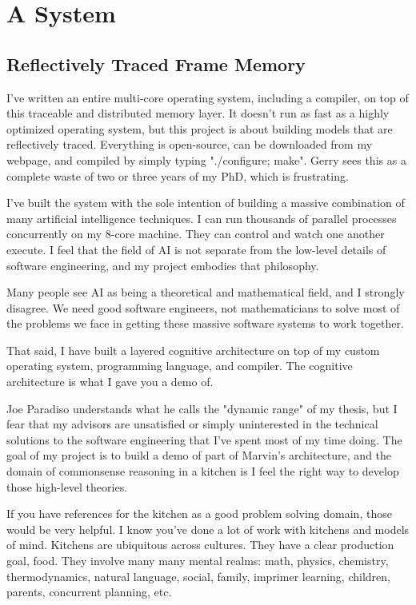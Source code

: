 \chapter{A System}\label{ch:a_system}

\section{Reflectively Traced Frame Memory}


I've written an entire multi-core operating system, including a
compiler, on top of this traceable and distributed memory layer.  It
doesn't run as fast as a highly optimized operating system, but this
project is about building models that are reflectively traced.
Everything is open-source, can be downloaded from my webpage, and
compiled by simply typing "./configure; make".  Gerry sees this as a
complete waste of two or three years of my PhD, which is frustrating.

I've built the system with the sole intention of building a massive
combination of many artificial intelligence techniques.  I can run
thousands of parallel processes concurrently on my 8-core machine.  They
can control and watch one another execute.  I feel that the field of AI
is not separate from the low-level details of software engineering, and
my project embodies that philosophy.

Many people see AI as being a theoretical and mathematical field, and I
strongly disagree.  We need good software engineers, not mathematicians
to solve most of the problems we face in getting these massive software
systems to work together.

That said, I have built a layered cognitive architecture on top of my
custom operating system, programming language, and compiler.  The
cognitive architecture is what I gave you a demo of.

Joe Paradiso understands what he calls the "dynamic range" of my thesis,
but I fear that my advisors are unsatisfied or simply uninterested in
the technical solutions to the software engineering that I've spent most
of my time doing.  The goal of my project is to build a demo of part of
Marvin's architecture, and the domain of commonsense reasoning in a
kitchen is I feel the right way to develop those high-level theories.

If you have references for the kitchen as a good problem solving domain,
those would be very helpful.  I know you've done a lot of work with
kitchens and models of mind.  Kitchens are ubiquitous across cultures.
They have a clear production goal, food.  They involve many many mental
realms: math, physics, chemistry, thermodynamics, natural language,
social, family, imprimer learning, children, parents, concurrent
planning, etc.


